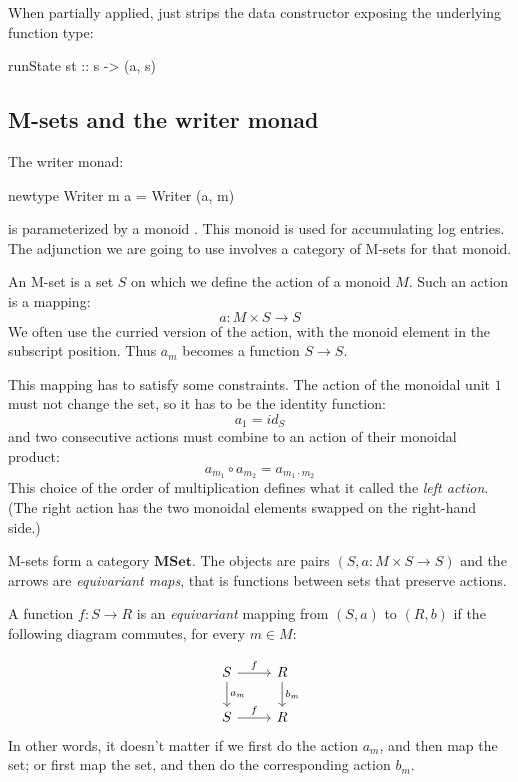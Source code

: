 \documentclass[DaoFP]{subfiles}
\begin{document}
When partially applied,  just strips the data constructor exposing the underlying function type:
\begin{haskell}
runState st ::  s -> (a, s)
\end{haskell}



\subsection{M-sets and the writer monad}

The writer monad:
\begin{haskell}
newtype Writer m a = Writer (a, m)
\end{haskell}
is parameterized by a monoid . This monoid is used for accumulating log entries. The adjunction we are going to use involves a category of M-sets for that monoid. 

An M-set is a set $S$ on which we define the action of a monoid $M$. Such an action is a mapping:
\[a \colon M \times S \to S \]
We often use the curried version of the action, with the monoid element in the subscript position. Thus $a_m$ becomes a function $S \to S$. 

This mapping has to satisfy some constraints. The action of the monoidal unit $1$ must not change the set, so it has to be the identity function:
\[ a_1 = id_S \]
and two consecutive actions must combine to an action of their monoidal product:
\[ a_{m_1} \circ a_{m_2} = a_{m_1 \cdot m_2} \]
This choice of the order of multiplication defines what it called the \emph{left action}. (The right action has the two monoidal elements swapped on the right-hand side.)

M-sets form a category $\mathbf{MSet}$. The objects are pairs $(S, a\colon M\times S \to S)$ and the arrows are  \emph{equivariant maps}, that is  functions between sets that preserve actions. 

A function $f \colon S \to R$ is an \emph{equivariant} mapping from $(S, a)$ to $(R, b)$ if the following diagram commutes, for every $m \in M$:

\[
 \begin{tikzcd}
 S 
 \arrow[r, "f"]
 \arrow[d, "a_m"]
 & R
\arrow[d, "b_m"]
 \\
S
 \arrow[r, "f"]
 & R
  \end{tikzcd}
\]
In other words, it doesn't matter if we first do the action $a_m$, and then map the set; or first map the set, and then do the corresponding action $b_m$.
\end{document}
